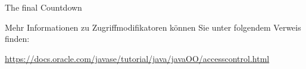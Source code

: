 \documentclass{../tuda-exercise}
\begin{document}
\begin{task}[credit=\stars{3}{3}]{The final Countdown}
\begin{solution}
      \begin{note}
        Mehr Informationen zu Zugriffmodifikatoren können Sie unter folgendem Verweis finden:

        \begin{center}
          \url{https://docs.oracle.com/javase/tutorial/java/javaOO/accesscontrol.html}
        \end{center}
      \end{note}
    \end{solution}
  \end{task}
\end{document}
